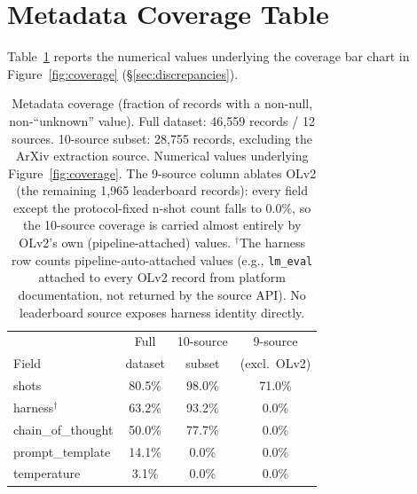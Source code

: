 \documentclass[11pt]{article}
\begin{document}
\begin{table}[ht]
\centering
\small
\setlength{\tabcolsep}{4pt}%
\caption{Gemma-2-9B BBH scores across five sources (\S\ref{sec:sealion}).
Two clusters: shared pipeline origin (OLv2/SEA-LION) and protocol mismatch
(3-shot log-likelihood vs.\ 0-shot CoT).}
\label{tab:sealion-app}
\end{table}


\section{Metadata Coverage Table}
\label{app:coverage}

Table~\ref{tab:coverage-app} reports the numerical values underlying the
coverage bar chart in Figure~\ref{fig:coverage} (\S\ref{sec:discrepancies}).

\begin{table}[ht]
\centering
\small
\begin{tabular}{lccc}
\toprule
 & Full & 10-source & 9-source \\
Field & dataset & subset & (excl.\ OLv2) \\
\midrule
shots & 80.5\% & 98.0\% & 71.0\% \\
harness$^{\dagger}$ & 63.2\% & 93.2\% & 0.0\% \\
chain\_of\_thought & 50.0\% & 77.7\% & 0.0\% \\
prompt\_template & 14.1\% & 0.0\% & 0.0\% \\
temperature & 3.1\% & 0.0\% & 0.0\% \\
\bottomrule
\end{tabular}
\caption{Metadata coverage (fraction of records with a non-null,
non-``unknown'' value). Full dataset: 46{,}559 records / 12 sources.
10-source subset: 28{,}755 records, excluding the ArXiv extraction
source. Numerical values underlying Figure~\ref{fig:coverage}.
The 9-source column ablates OLv2 (the remaining 1{,}965 leaderboard
records): every field except the protocol-fixed n-shot count falls to
0.0\%, so the 10-source coverage is carried almost entirely by OLv2's
own (pipeline-attached) values.
$^{\dagger}$The harness row counts pipeline-auto-attached values
(e.g., \texttt{lm\_eval} attached to every OLv2 record from platform
documentation, not returned by the source API). No leaderboard source
exposes harness identity directly.}
\label{tab:coverage-app}
\end{table}
\end{document}
